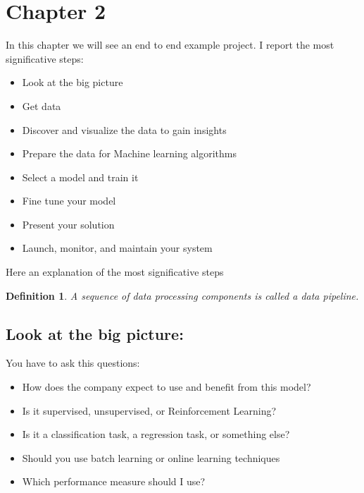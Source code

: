 \documentclass{article}
\newtheorem{definition}{Definition}
\begin{document}
\section{Chapter 2}
In this chapter we will see an end to end example project.
I report the most significative steps:

\begin{itemize}
\item{Look at the big picture}
\item{Get data}
\item{Discover and visualize the data to gain insights}
\item{Prepare the data for Machine learning algorithms}
\item{Select a model and train it}
\item{Fine tune your model}
\item{Present your solution}
\item{Launch, monitor, and maintain your system}
\end{itemize}

Here an explanation of the most significative steps
\begin{definition}
A sequence of data processing components is called a data pipeline.
\end{definition}

\subsection{Look at the big picture:}
You have to ask this questions:
\begin{itemize}
\item{How does the company expect to use and benefit from this model?}
\item{Is it supervised, unsupervised, or Reinforcement Learning? }
\item{Is it a classification task, a regression task, or something else?}
\item{Should you use batch learning or online learning techniques}
\item{Which performance measure should I use?}
\end{itemize}
\end{document}
